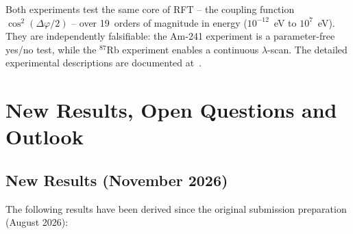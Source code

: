 \documentclass[12pt]{iopart}
\begin{document}
	Both experiments test the same core of RFT -- the
	coupling function $\cos^2(\Delta\varphi/2)$ -- over
	19~orders of magnitude in energy ($10^{-12}$~eV to
	$10^7$~eV). They are independently falsifiable: the
	Am-241 experiment is a parameter-free yes/no test,
	while the ${}^{87}$Rb experiment enables a continuous
	$\lambda$-scan. The detailed experimental descriptions
	are documented at~\cite{rftrepo}.
	
	
	\section{New Results, Open Questions and Outlook}
	
	\subsection{New Results (November 2026)}
	\label{sec:new_results}
	
	The following results have been derived since the original
	submission preparation (August 2026):
	
\end{document}

